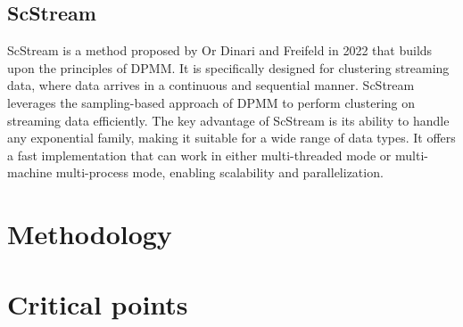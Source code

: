 \documentclass[12pt]{article}
\begin{document}
        \subsection{ScStream}\label{subsec:scstream}
ScStream is a method proposed by Or Dinari and Freifeld in 2022 that builds upon the principles of DPMM.
It is specifically designed for clustering streaming data, where data arrives in a continuous and sequential manner.
ScStream leverages the sampling-based approach of DPMM to perform clustering on streaming data efficiently.
The key advantage of ScStream is its ability to handle any exponential family, making it suitable for a wide range of data types.
It offers a fast implementation that can work in either multi-threaded mode or multi-machine multi-process mode, enabling scalability and parallelization.
\pagebreak

\section{Methodology}\label{sec:methodology}


\section{Critical points}\label{sec:critical}

\end{document}
